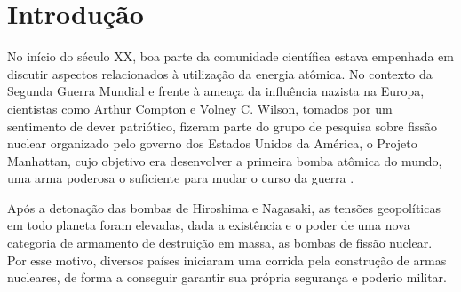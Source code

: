 \chapter{Introdução}

No início do século XX, boa parte da comunidade científica estava empenhada em discutir
aspectos relacionados à utilização da energia atômica. No contexto da Segunda Guerra Mundial
e frente à ameaça da influência nazista na Europa, cientistas como Arthur Compton e
Volney C. Wilson, tomados por um sentimento de dever patriótico, fizeram parte do grupo
de pesquisa sobre fissão nuclear organizado pelo governo dos Estados Unidos da América,
o Projeto Manhattan, cujo objetivo era desenvolver a primeira bomba atômica do mundo,
uma arma poderosa o suficiente para mudar o curso da guerra \cite{Badash2005}.

Após a detonação das bombas de Hiroshima e Nagasaki, as tensões geopolíticas em todo planeta foram elevadas,
dada a existência e o poder de uma nova categoria de armamento de destruição em massa, as bombas de fissão nuclear.
Por esse motivo, diversos países iniciaram uma corrida pela construção de armas nucleares, de forma a conseguir
garantir sua própria segurança e poderio militar. \cite{Gavin2010}

